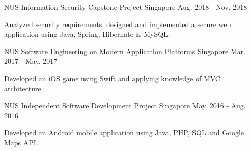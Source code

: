 \begin{cventries}
  \cventry
    {NUS} %
    {Information Security Capstone Project} %
    {Singapore} %
    {Aug. 2018 - Nov. 2018} %
    {
      \begin{cvitems} %
        \item {Analyzed security requirements, designed and implemented a secure web application using Java, Spring, Hibernate \& MySQL.}
      \end{cvitems}
    }

  \cventry
    {NUS} %
    {Software Engineering on Modern Application Platforms} %
    {Singapore} %
    {Mar. 2017 - May. 2017} %
    {
      \begin{cvitems} %
        \item {Developed an \href{https://github.com/Zhiyuan-Amos/Train-to-Changi}{iOS game} using Swift and applying knowledge of MVC architecture.}
      \end{cvitems}
    }

  \cventry
    {NUS} %
    {Independent Software Development Project} %
    {Singapore} %
    {May. 2016 - Aug. 2016} %
    {
      \begin{cvitems} %
        \item {Developed an \href{https://github.com/Zhiyuan-Amos/Wut-2-Do}{Android mobile application} using Java, PHP, SQL and Google Maps API.}
      \end{cvitems}
    }

\end{cventries}
